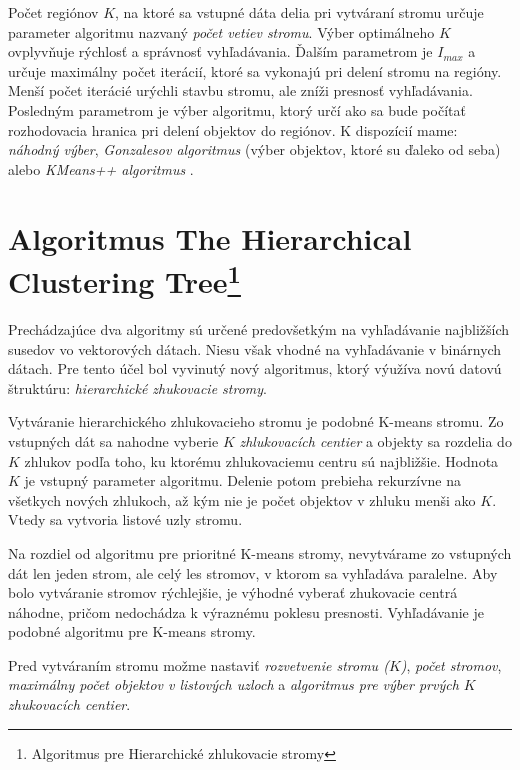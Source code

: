 \documentclass[12pt,oneside]{fithesis2}
\begin{document}
	Počet regiónov $K$, na ktoré sa vstupné dáta delia pri vytváraní stromu určuje parameter algoritmu nazvaný \textit{počet vetiev stromu}. Výber optimálneho $K$ ovplyvňuje rýchlosť a správnosť vyhľadávania. Ďalším parametrom je $I_{max}$ a určuje maximálny počet iterácií, ktoré sa vykonajú pri delení stromu na regióny. Menší počet iterácié urýchli stavbu stromu, ale zníži presnosť vyhľadávania. Posledným parametrom je výber algoritmu, ktorý určí ako sa bude počítať rozhodovacia hranica pri delení objektov do regiónov. K dispozícií mame: \textit{náhodný výber}, \textit{Gonzalesov algoritmus} (výber objektov, ktoré su ďaleko od seba) alebo  \textit{KMeans++ algoritmus} \cite{K-means++}. \cite{flann_pami_2014}
	
	\section{Algoritmus The Hierarchical Clustering Tree\protect\footnote{Algoritmus pre Hierarchické zhlukovacie stromy}}
	Prechádzajúce dva algoritmy sú určené predovšetkým na vyhľadávanie najbližších susedov vo vektorových dátach. Niesu však vhodné na vyhľadávanie v binárnych dátach. Pre tento účel bol vyvinutý nový algoritmus, ktorý výužíva novú datovú štruktúru: \textit{hierarchické zhukovacie stromy}. \cite{Attach:binary_matching_crv2012}
	
	Vytváranie hierarchického zhlukovacieho stromu je podobné K-means stromu.   Zo vstupných dát sa nahodne vyberie $K$ \textit{zhlukovacích centier} a objekty sa rozdelia do $K$ zhlukov podľa toho, ku ktorému zhlukovaciemu centru sú najbližšie. Hodnota $K$ je vstupný parameter algoritmu. Delenie potom prebieha rekurzívne na všetkych nových zhlukoch, až kým nie je počet objektov v zhluku menši ako $K$. Vtedy sa vytvoria listové uzly stromu. \cite{Attach:binary_matching_crv2012}
	
	Na rozdiel od algoritmu pre prioritné K-means stromy, nevytvárame zo vstupných dát len jeden strom, ale celý les stromov, v ktorom sa vyhľadáva paralelne. Aby bolo vytváranie stromov rýchlejšie, je výhodné vyberať zhukovacie centrá náhodne, pričom nedochádza k výraznému poklesu presnosti. Vyhľadávanie je podobné algoritmu pre K-means stromy. \cite{Attach:binary_matching_crv2012}
	
	Pred vytváraním stromu možme nastaviť \textit{rozvetvenie stromu ($K$)}, \textit{počet stromov}, \textit{maximálny počet objektov v listových uzloch} a \textit{algoritmus pre výber prvých $K$ zhukovacích centier}. \cite{Attach:binary_matching_crv2012}
	
\end{document}
